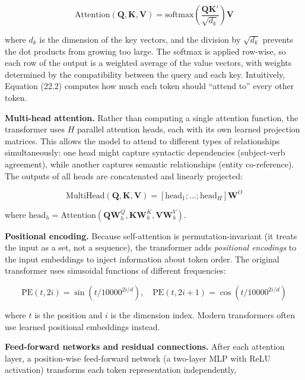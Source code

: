 \begin{equation}
\text{Attention}(\mathbf{Q}, \mathbf{K}, \mathbf{V}) = \text{softmax}\left(\frac{\mathbf{Q}\mathbf{K}'}{\sqrt{d_k}}\right) \mathbf{V}
\tag{22.2}
\end{equation}

where $d_k$ is the dimension of the key vectors, and the division by $\sqrt{d_k}$ prevents the dot products from growing too large. The softmax is applied row-wise, so each row of the output is a weighted average of the value vectors, with weights determined by the compatibility between the query and each key. Intuitively, Equation (22.2) computes how much each token should ``attend to'' every other token.

\textbf{Multi-head attention.} Rather than computing a single attention function, the transformer uses $H$ parallel attention heads, each with its own learned projection matrices. This allows the model to attend to different types of relationships simultaneously: one head might capture syntactic dependencies (subject-verb agreement), while another captures semantic relationships (entity co-reference). The outputs of all heads are concatenated and linearly projected:

\begin{equation}
\text{MultiHead}(\mathbf{Q}, \mathbf{K}, \mathbf{V}) = [\text{head}_1; \ldots; \text{head}_H] \mathbf{W}^O
\tag{22.3}
\end{equation}

where $\text{head}_h = \text{Attention}(\mathbf{Q}\mathbf{W}_h^Q, \mathbf{K}\mathbf{W}_h^K, \mathbf{V}\mathbf{W}_h^V)$.

\textbf{Positional encoding.} Because self-attention is permutation-invariant (it treats the input as a set, not a sequence), the transformer adds \textit{positional encodings} to the input embeddings to inject information about token order. The original transformer uses sinusoidal functions of different frequencies:

\begin{equation}
\text{PE}(t, 2i) = \sin(t / 10000^{2i/d}), \quad \text{PE}(t, 2i+1) = \cos(t / 10000^{2i/d})
\tag{22.4}
\end{equation}

where $t$ is the position and $i$ is the dimension index. Modern transformers often use learned positional embeddings instead.

\textbf{Feed-forward networks and residual connections.} After each attention layer, a position-wise feed-forward network (a two-layer MLP with ReLU activation) transforms each token representation independently,

